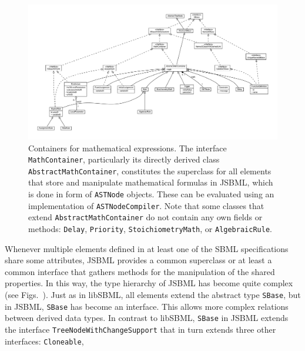 \begin{figure}
 \centering
 \includegraphics[width=\textwidth]{img/MathContainer.pdf}
 \caption[Containers for mathematical expressions]{Containers for mathematical
 expressions. The interface \texttt{MathContainer}, particularly
 its directly derived class \texttt{AbstractMathContainer}, constitutes the
 superclass for all elements that store and manipulate mathematical formulas in
 JSBML, which is done in form of \texttt{ASTNode} objects. These can be
 evaluated using an implementation of \texttt{ASTNodeCompiler}. Note that some
 classes that extend \texttt{AbstractMathContainer} do not contain any own
 fields or methods: \texttt{Delay}, \texttt{Priority},
 \texttt{StoichiometryMath}, or \texttt{AlgebraicRule}.}
 \label{fig:MathContainerHierarchy}
\end{figure}
Whenever multiple elements defined in at least one of the SBML
%
specifications
%
share some attributes, JSBML
%
provides a common superclass or at least a common interface that gathers methods
for the manipulation of the shared properties. In this way, the type hierarchy
of JSBML
%
has become quite complex (see
Figs.~). Just as in
libSBML,
%
all elements extend the abstract type \texttt{SBase},
%
but in JSBML, \texttt{SBase} has become an interface. This allows more complex
relations between derived data types. In contrast to libSBML, \texttt{SBase} in
JSBML extends the interface \texttt{TreeNodeWithChangeSupport}%
that in turn extends three other interfaces: \texttt{Cloneable},

